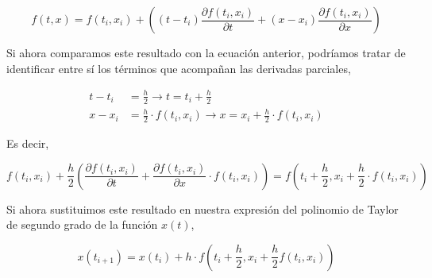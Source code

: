 \begin{equation*}
f(t,x)=f(t_i,x_i)+\left((t-t_i)\frac{\partial f(t_i,x_i)}{\partial t}+(x-x_i)\frac{\partial f(t_i,x_i)}{\partial x}\right)
\end{equation*}

\begin{paracol}{2}
Si ahora comparamos este resultado con la ecuación anterior, podríamos tratar de identificar entre sí los términos que acompañan las derivadas parciales, 
\end{paracol}
\begin{align*}
t-t_i&=\frac{h}{2} \rightarrow t=t_i+\frac{h}{2}\\
x-x_i&=\frac{h}{2}\cdot f(t_i,x_i) \rightarrow x=x_i+\frac{h}{2}\cdot f(t_i,x_i)
\end{align*}
\begin{paracol}{2}
Es decir,
\end{paracol}
\begin{equation*}
f(t_i,x_i)+\frac{h}{2}\left(\frac{\partial f(t_i,x_i)}{\partial t}+\frac{\partial f(t_i,x_i)}{\partial x}\cdot f(t_i,x_i)\right)=f(t_i+\frac{h}{2},x_i+\frac{h}{2}\cdot f(t_i,x_i))
\end{equation*}
\begin{paracol}{2}
Si ahora sustituimos este resultado en nuestra expresión del polinomio de Taylor de segundo grado de la función $x(t)$,
\end{paracol}
\begin{equation*}
x(t_{i+1})=x(t_i)+h\cdot f(t_i+\frac{h}{2},x_i+\frac{h}{2}f(t_i,x_i))
\end{equation*}

